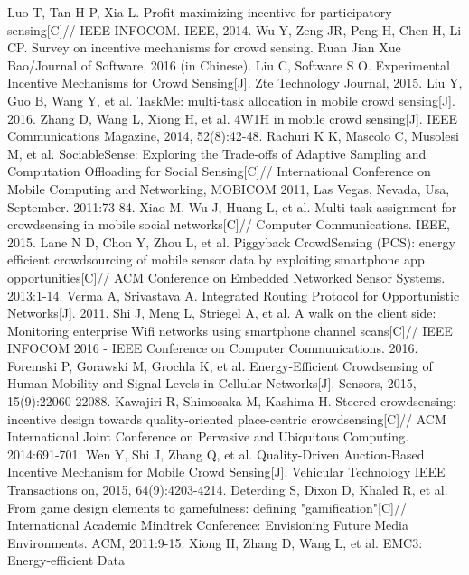 \documentclass[UTF8]{ctexart}
\begin{document}
\begin{thebibliography}{99}
   Luo T, Tan H P, Xia L. Profit-maximizing incentive for
  participatory sensing[C]// IEEE INFOCOM. IEEE, 2014.
   Wu Y, Zeng JR, Peng H, Chen H, Li CP. Survey on incentive mechanisms
  for crowd sensing. Ruan Jian Xue Bao/Journal of Software, 2016 (in Chinese).
   Liu C, Software S O. Experimental Incentive Mechanisms for Crowd
  Sensing[J]. Zte Technology Journal, 2015.
   Liu Y, Guo B, Wang Y, et al. TaskMe: multi-task allocation in
  mobile crowd sensing[J]. 2016.
   Zhang D, Wang L, Xiong H, et al. 4W1H in mobile crowd sensing[J].
  IEEE Communications Magazine, 2014, 52(8):42-48.
   Rachuri K K, Mascolo C, Musolesi M, et al. SociableSense: Exploring
  the Trade-offs of Adaptive Sampling and Computation Offloading for Social
  Sensing[C]// International Conference on Mobile Computing and Networking,
  MOBICOM 2011, Las Vegas, Nevada, Usa, September. 2011:73-84.
   Xiao M, Wu J, Huang L, et al. Multi-task assignment
  for crowdsensing in mobile social networks[C]// Computer Communications.
  IEEE, 2015.
   Lane N D, Chon Y, Zhou L, et al. Piggyback CrowdSensing (PCS):
  energy efficient crowdsourcing of mobile sensor data by exploiting smartphone
  app opportunities[C]// ACM Conference on Embedded Networked Sensor Systems.
  2013:1-14.
   Verma A, Srivastava A. Integrated Routing Protocol for
  Opportunistic Networks[J]. 2011.
   Shi J, Meng L, Striegel A, et al. A walk on the client side:
  Monitoring enterprise Wifi networks using smartphone channel scans[C]// IEEE
  INFOCOM 2016 - IEEE Conference on Computer Communications. 2016.
   Foremski P, Gorawski M, Grochla K, et al. Energy-Efficient
  Crowdsensing of Human Mobility and Signal Levels in Cellular Networks[J]. Sensors,
  2015, 15(9):22060-22088.
   Kawajiri R, Shimosaka M, Kashima H. Steered crowdsensing:
  incentive design towards quality-oriented place-centric crowdsensing[C]// ACM
  International Joint Conference on Pervasive and Ubiquitous Computing.
  2014:691-701.
   Wen Y, Shi J, Zhang Q, et al. Quality-Driven Auction-Based
  Incentive Mechanism for Mobile Crowd Sensing[J]. Vehicular Technology IEEE
  Transactions on, 2015, 64(9):4203-4214.
   Deterding S, Dixon D, Khaled R, et al. From game design elements
  to gamefulness: defining "gamification"[C]// International Academic Mindtrek
  Conference: Envisioning Future Media Environments. ACM, 2011:9-15.
   Xiong H, Zhang D, Wang L, et al. EMC3: Energy-efficient Data

\end{thebibliography}
\end{document}
